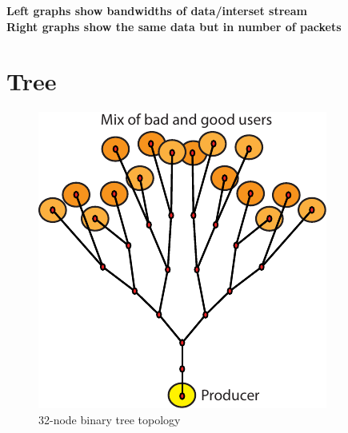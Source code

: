 \documentclass[onecolumn]{IEEEtran}
\begin{document}

% 



% 

\clearpage

\textbf{\color{red}Left graphs show bandwidths of data/interset stream\\
Right graphs show the same data but in number of packets}

\section{Tree}

\begin{figure}[h]
  \centering
  
\includegraphics[scale=1]{selected-results/topo-tree.pdf}
  
  \caption{32-node binary tree topology}
\end{figure}
\end{document}
